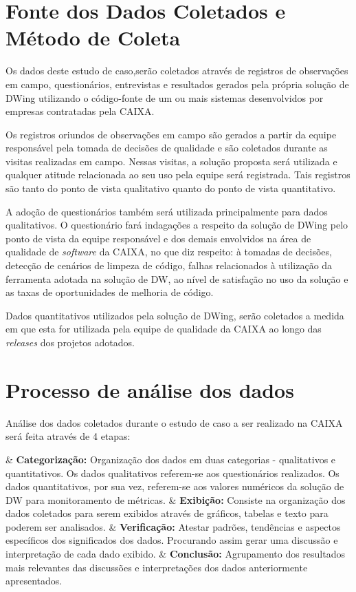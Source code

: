     

\section{Fonte dos Dados Coletados e Método de Coleta}
\label{sec:fonte} 

Os dados deste estudo de caso,serão coletados através de registros de observações em campo, questionários, entrevistas e resultados gerados pela própria solução de DWing utilizando o código-fonte de um ou mais sistemas desenvolvidos por empresas contratadas pela CAIXA.

Os registros oriundos de observações em campo são gerados a partir da equipe responsável pela tomada de decisões de qualidade e são coletados durante as visitas realizadas em campo. Nessas visitas, a solução proposta será utilizada e qualquer atitude relacionada ao seu uso pela equipe será registrada. Tais registros são tanto do ponto de vista qualitativo quanto do ponto de vista quantitativo.

A adoção de questionários também será utilizada principalmente para dados qualitativos. O questionário fará indagações a respeito da solução de DWing pelo ponto de vista da equipe responsável e dos demais envolvidos na área de qualidade de \textit{software} da CAIXA, no que diz respeito: à tomadas de decisões, detecção de cenários de limpeza de código, falhas relacionados à utilização da ferramenta adotada na solução de DW, ao nível de satisfação no uso da solução e as taxas de oportunidades de melhoria de código. 

Dados quantitativos utilizados pela solução de DWing, serão coletados a medida em que esta for utilizada pela equipe de qualidade da CAIXA ao longo das \textit{releases} dos projetos adotados.

\section{Processo de análise dos dados}
\label{sec:analise} 

Análise dos dados coletados durante o estudo de caso a ser realizado na CAIXA será feita através de 4 etapas:

\begin{easylist}[itemize]	
	
	& \textbf{Categorização: } Organização dos dados em duas categorias - qualitativos e quantitativos. Os dados qualitativos referem-se aos questionários realizados. Os dados quantitativos, por sua vez, referem-se aos valores numéricos da solução de DW para monitoramento de métricas. 
	& \textbf{Exibição: } Consiste na organização dos dados coletados para serem exibidos através de gráficos, tabelas e texto para poderem ser analisados. 
	& \textbf{Verificação: } Atestar padrões, tendências e aspectos específicos dos significados dos dados. Procurando assim gerar uma discussão e interpretação de cada dado exibido.
	& \textbf{Conclusão: } Agrupamento dos resultados mais relevantes das discussões e interpretações dos dados anteriormente apresentados.
	
	\end{easylist}	


